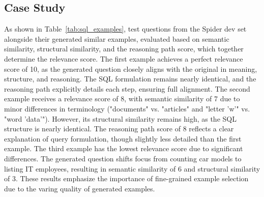 \subsection{Case Study}
As shown in Table~\ref{tab:sql_examples}, test questions from the Spider dev set alongside their generated similar examples, evaluated based on semantic similarity, structural similarity, and the reasoning path score, which together determine the relevance score. The first example achieves a perfect relevance score of 10, as the generated question closely aligns with the original in meaning, structure, and reasoning. The SQL formulation remains nearly identical, and the reasoning path explicitly details each step, ensuring full alignment. The second example receives a relevance score of 8, with semantic similarity of 7 due to minor differences in terminology ("documents" vs. "articles" and "letter 'w'" vs. "word 'data'"). However, its structural similarity remains high, as the SQL structure is nearly identical. The reasoning path score of 8 reflects a clear explanation of query formulation, though slightly less detailed than the first example. The third example has the lowest relevance score due to significant differences. The generated question shifts focus from counting car models to listing IT employees, resulting in semantic similarity of 6 and structural similarity of 3. These results emphasize the importance of fine-grained example selection due to the varing quality of generated examples.
